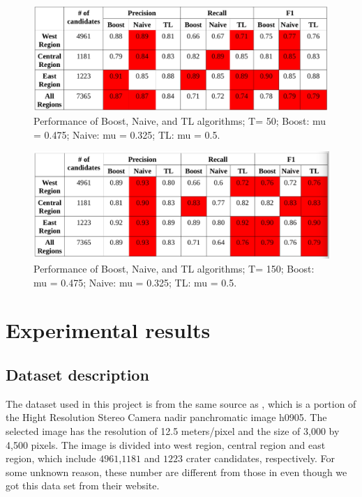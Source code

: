 \documentclass[conference]{IEEEtran}
\begin{document}
\begin{figure}[ht]
\begin{center}
\includegraphics[scale=0.45]{T_50.png}
\caption{Performance of Boost, Naive, and TL algorithms; T= 50; Boost: mu = 0.475; Naive: mu = 0.325; TL: mu = 0.5.}
\label{T50}
\end{center}
\end{figure}

\begin{figure}[ht]
\begin{center}
\includegraphics[scale=0.45]{T_150.png}
\caption{Performance of Boost, Naive, and TL algorithms; T= 150; Boost: mu = 0.475; Naive: mu = 0.325; TL: mu = 0.5.}
\label{T150}
\end{center}
\end{figure}

\section{Experimental results}
\subsection{Dataset description}

The dataset used in this project is from the same source as \cite{ding2011subkilometer}, which is a portion of the Hight Resolution Stereo Camera nadir panchromatic image h0905. The selected image has the resolution of 12.5 meters/pixel and the size of 3,000 by 4,500 pixels. The image is divided into west region, central region and east region, which include $4961$,$1181$ and $1223$ crater candidates, respectively. For some unknown reason, these number are different from those in \cite{ding2011subkilometer} even though we got this data set from their website.
\end{document}
